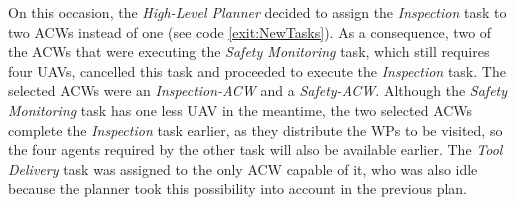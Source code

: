 On this occasion, the \emph{High-Level Planner} decided to assign the \emph{Inspection} task to two \glspl{ACW} instead of one (see code \ref{exit:NewTasks}). As a consequence, two of the \glspl{ACW} that were executing the \emph{Safety Monitoring} task, which still requires four \glspl{UAV}, cancelled this task and proceeded to execute the \emph{Inspection} task. The selected \glspl{ACW} were an \emph{Inspection-ACW} and a \emph{Safety-ACW}. Although the \emph{Safety Monitoring} task has one less \gls{UAV} in the meantime, the two selected \glspl{ACW} complete the \emph{Inspection} task earlier, as they distribute the \glspl{WP} to be visited, so the four agents required by the other task will also be available earlier. The \emph{Tool Delivery} task was assigned to the only \gls{ACW} capable of it, who was also idle because the planner took this possibility into account in the previous plan.

